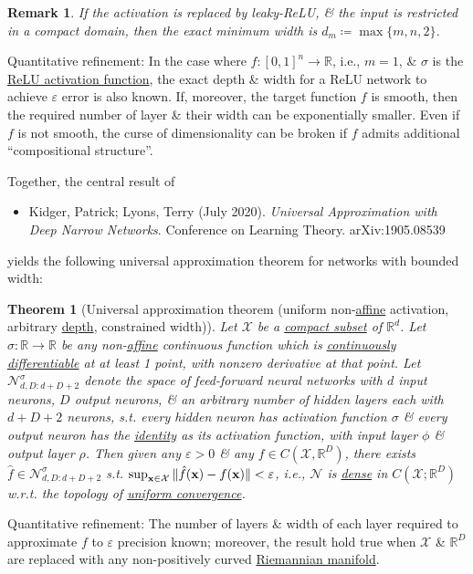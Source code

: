\documentclass{article}
\newtheorem{remark}{Remark}
\newtheorem{theorem}{Theorem}
\begin{document}
\begin{remark}
	If the activation is replaced by leaky-ReLU, \& the input is restricted in a compact domain, then the exact minimum width is $d_m\coloneqq\max\{m,n,2\}$.
\end{remark}
{\sf Quantitative refinement}: In the case where $f:[0,1]^n\to\mathbb{R}$, i.e., $m = 1$, \& $\sigma$ is the \href{https://en.wikipedia.org/wiki/Rectifier_(neural_networks)}{ReLU activation function}, the exact depth \& width for a ReLU network to achieve $\varepsilon$ error is also known. If, moreover, the target function $f$ is smooth, then the required number of layer \& their width can be exponentially smaller. Even if $f$ is not smooth, the curse of dimensionality can be broken if $f$ admits additional ``compositional structure''.

Together, the central result of
\begin{itemize}
	\item {\sc Kidger, Patrick; Lyons, Terry} (July 2020). {\it Universal Approximation with Deep Narrow Networks}. Conference on Learning Theory. arXiv:1905.08539
\end{itemize}
yields the following universal approximation theorem for networks with bounded width:

\begin{theorem}[Universal approximation theorem (uniform non-\href{https://en.wikipedia.org/wiki/Affine_transformation}{affine} activation, arbitrary \href{https://en.wikipedia.org/wiki/Deep_learning}{depth}, constrained width)]
	Let $\mathcal{X}$ be a \href{https://en.wikipedia.org/wiki/Compact_set}{compact subset} of $\mathbb{R}^d$. Let $\sigma:\mathbb{R}\to\mathbb{R}$ be any non-\href{https://en.wikipedia.org/wiki/Affine_transformation}{affine} continuous function which is \href{https://en.wikipedia.org/wiki/Differentiable_function#Differentiability_classes}{continuously differentiable} at at least 1 point, with nonzero derivative at that point. Let $\mathcal{N}_{d,D:d + D + 2}^\sigma$ denote the space of feed-forward neural networks with $d$ input neurons, $D$ output neurons, \& an arbitrary number of hidden layers each with $d + D + 2$ neurons, s.t. every hidden neuron has activation function $\sigma$ \& every output neuron has the \href{https://en.wikipedia.org/wiki/Identity_function}{identity} as its activation function, with input layer $\phi$ \& output layer $\rho$. Then given any $\varepsilon > 0$ \& any $f\in C(\mathcal{X},\mathbb{R}^D)$, there exists $\hat{f}\in\mathcal{N}_{d,D:d + D + 2}^\sigma$ s.t. $\sup_{{\bf x}\in\mathcal{X}} \|\hat{f}({\bf x}) - f({\bf x})\| < \varepsilon$, i.e., $\mathcal{N}$ is \href{https://en.wikipedia.org/wiki/Dense_set}{dense} in $C(\mathcal{X};\mathbb{R}^D)$ w.r.t. the topology of \href{https://en.wikipedia.org/wiki/Uniform_convergence}{uniform convergence}.
\end{theorem}
{\sf Quantitative refinement}: The number of layers \& width of each layer required to approximate $f$ to $\varepsilon$ precision known; moreover, the result hold true when $\mathcal{X}$ \& $\mathbb{R}^D$ are replaced with any non-positively curved \href{https://en.wikipedia.org/wiki/Riemannian_manifold}{Riemannian manifold}.
\end{document}
